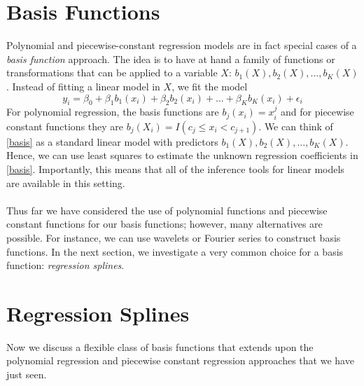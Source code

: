\section{Basis Functions}
Polynomial and piecewise-constant regression models are in fact special cases of a \textit{basis function} approach. The idea is to have at hand a family of functions or transformations that can be applied to a variable $X$: $b_1(X), b_2(X), ..., b_K(X)$. Instead of fitting a linear model in $X$, we fit the model
\begin{equation}
    y_i = \beta_0 + \beta_1b_1(x_i) + \beta_2b_2(x_i) + ... + \beta_Kb_K(x_i) + \epsilon_i
    \label{basis}
\end{equation}
For polynomial regression, the basis functions are $b_j(x_i) = x_i^j$ and for piecewise constant functions they are $b_j(X_i) = I(c_j \leq x_i < c_{j+1})$. We can think of \ref{basis} as a standard linear model with predictors $b_1(X), b_2(X), ..., b_K(X)$. Hence, we can use least squares to estimate the unknown regression coefficients in \ref{basis}.  Importantly, this means that all of the inference tools for linear models are available in this setting.\\\\
Thus far we have considered the use of polynomial functions and piecewise constant functions for our basis functions; however, many alternatives are possible. For instance, we can use wavelets or Fourier series to construct basis functions. In the next section, we investigate a very common choice for a basis function: \textit{regression splines}.

\section{Regression Splines}
Now we discuss a flexible class of basis functions that extends upon the polynomial regression and piecewise constant regression approaches that we have just seen.

